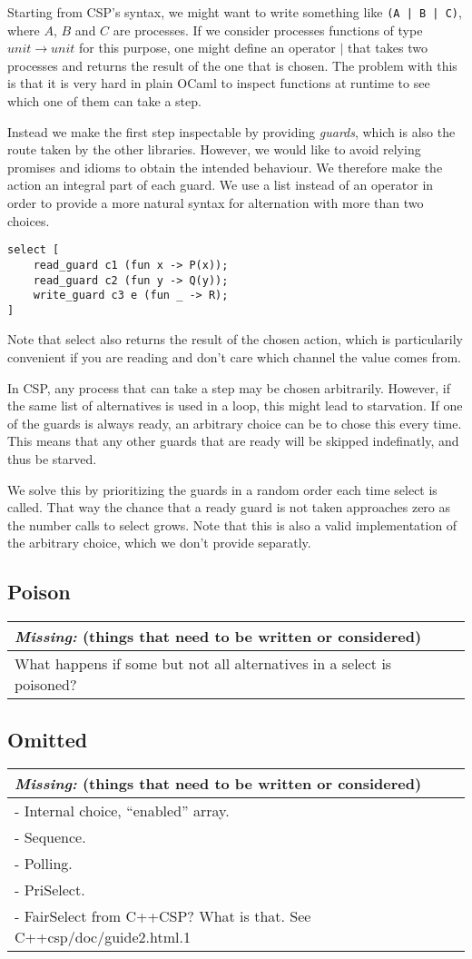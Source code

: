\documentclass[a4paper,12pt]{article}
\newcommand{\missing}[1]{
\begin{tabular}{|p{11cm}|}
\hline
\emph{Missing:} {\scriptsize (things that need to be written or considered)} \\
\hline
#1
\hline
\end{tabular}
}
\begin{document}
Starting from CSP's syntax, we might want to write something like \texttt{(A | B | C)}, where $A$, $B$
and $C$ are processes. If we consider processes functions of type $unit \to unit$ for this purpose, 
one might define an operator $|$ that takes two processes and returns the result of the one that is 
chosen. The problem with this is that it is very hard in plain OCaml to inspect functions at runtime to 
see which one of them can take a step.

Instead we make the first step inspectable by providing \emph{guards}, which is also the route taken by
the other libraries. However, we would like to avoid relying promises and idioms to obtain the 
intended behaviour. We therefore make the action an integral part of each guard. We use a list instead
of an operator in order to provide a more natural syntax for alternation with more than two choices.

\begin{verbatim}
select [
    read_guard c1 (fun x -> P(x));
    read_guard c2 (fun y -> Q(y));
    write_guard c3 e (fun _ -> R);
]
\end{verbatim}
Note that select also returns the result of the chosen action, which is particularily convenient if you
are reading and don't care which channel the value comes from.

In CSP, any process that can take a step may be chosen arbitrarily. However, if the same list of 
alternatives is used in a loop, this might lead to starvation. If one of the guards is always ready,
an arbitrary choice can be to chose this every time. This means that any other guards that are ready
will be skipped indefinatly, and thus be starved.

We solve this by prioritizing the guards in a random order each time select is called. That way the
chance that a ready guard is not taken approaches zero as the number calls to select grows. Note that
this is also a valid implementation of the arbitrary choice, which we don't provide separatly.

\subsection{Poison}
\missing{
What happens if some but not all alternatives in a select is poisoned? \\
}

\subsection{Omitted}
\missing{
- Internal choice, ``enabled'' array.\\
- Sequence.\\
- Polling. \\
- PriSelect.\\
- FairSelect from C++CSP? What is that. See C++csp/doc/guide2.html.1 \\
}
\end{document}
